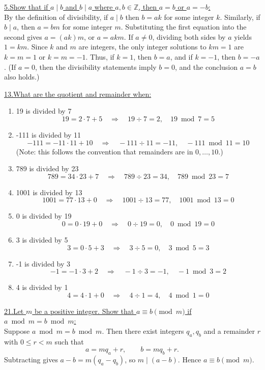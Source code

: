 \documentclass[12pt]{article}
\begin{document}
\vspace{5mm}
\underline{5.\;Show that if $a \mid b$ and $b\mid a$ where $a,b \in \mathbb{Z}$, then $a=b$ or $a=-b$:}
\\\indent By the definition of divisibility, if $a \mid b$ then $b = ak$ for some integer $k$.
Similarly, if $b \mid a$, then $a = bm$ for some integer $m$.
Substituting the first equation into the second gives $a = (ak)m$, or $a = akm$.
If $a\neq 0$, dividing both sides by $a$ yields $1 = km$.
Since $k$ and $m$ are integers, the only integer solutions to $km=1$ are $k=m=1$ or $k=m=-1$.
Thus, if $k=1$, then $b=a$, and if $k=-1$, then $b=-a$.
(If $a=0$, then the divisibility statements imply $b=0$, and the conclusion $a=b$ also holds.)

\vspace{5mm}
\underline{13.\;What are the quotient and remainder when:}
\begin{enumerate}[label=(\alph*)]
    \item 19 is divided by 7
    \[
    19 = 2 \cdot 7 + 5 \quad \Rightarrow \quad 19 \div 7 = 2, \quad 19 \bmod 7 = 5
    \]
    \item -111 is divided by 11
    \[
    -111 = -11 \cdot 11 + 10 \quad \Rightarrow \quad -111 \div 11 = -11, \quad -111 \bmod 11 = 10
    \]
    (Note: this follows the convention that remainders are in $0,\dots,10$.)
    \item 789 is divided by 23
    \[
    789 = 34 \cdot 23 + 7 \quad \Rightarrow \quad 789 \div 23 = 34, \quad 789 \bmod 23 = 7
    \]
    \item 1001 is divided by 13
    \[
    1001 = 77 \cdot 13 + 0 \quad \Rightarrow \quad 1001 \div 13 = 77, \quad 1001 \bmod 13 = 0
    \]
    \item 0 is divided by 19
    \[
    0 = 0 \cdot 19 + 0 \quad \Rightarrow \quad 0 \div 19 = 0, \quad 0 \bmod 19 = 0
    \]
    \item 3 is divided by 5
    \[
    3 = 0 \cdot 5 + 3 \quad \Rightarrow \quad 3 \div 5 = 0, \quad 3 \bmod 5 = 3
    \]
    \item -1 is divided by 3
    \[
    -1 = -1 \cdot 3 + 2 \quad \Rightarrow \quad -1 \div 3 = -1, \quad -1 \bmod 3 = 2
    \]
    \item 4 is divided by 1
    \[
    4 = 4 \cdot 1 + 0 \quad \Rightarrow \quad 4 \div 1 = 4, \quad 4 \bmod 1 = 0
    \]
\end{enumerate}

\vspace{5mm}
\noindent\underline{21.\;Let $m$ be a positive integer. Show that $a \equiv b \pmod{m}$ if $a \bmod m = b \bmod m$:}
\\\indent Suppose $a \bmod m = b \bmod m$. Then there exist integers $q_a,q_b$ and a remainder $r$ with $0\le r<m$ such that
\[
a = m q_a + r,\qquad b = m q_b + r.
\]
Subtracting gives $a-b = m(q_a-q_b)$, so $m\mid (a-b)$. Hence $a\equiv b\pmod m$.
\end{document}
